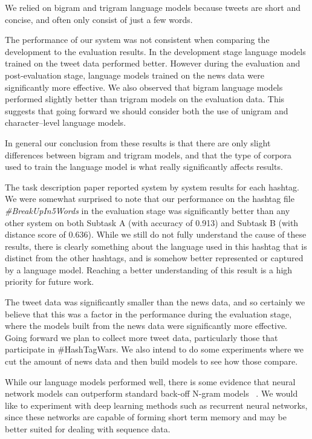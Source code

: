 \documentclass[11pt,a4paper]{article}
\begin{document}
We relied on bigram and trigram language models because 
tweets are short and concise, and often only consist of just
a few words. 

The performance of our system was not consistent when
comparing the development to the evaluation results.
In the development stage language models trained on the
tweet data performed better.
However during the evaluation and post-evaluation stage, 
language models trained on the news data were 
significantly more effective. We also observed that
bigram language models performed slightly better than
trigram models on the evaluation data. This suggests
that going forward we should consider both the use of
unigram and character--level language models. 

In general our 
conclusion from these results is that there are only 
slight differences between bigram and trigram models,
and that the type of corpora used to train the language
model is what really significantly affects results. 

The task description paper \cite{PotashRR17} 
reported system by system results for each hashtag. 
We were somewhat surprised to note that our 
performance on the hashtag file 
\textit{\#BreakUpIn5Words} in the evaluation 
stage was significantly 
better than any other  system on both Subtask A 
(with accuracy of 0.913) and Subtask B 
(with distance score of 0.636). While we still do not 
fully understand the cause of these results, there is clearly
something about the language used in this hashtag that
is distinct from the other hashtags, and is somehow better
represented or captured by a language model. Reaching a better
understanding of this  result is a high priority for future work. 

The tweet data was significantly smaller than the news data, and
so certainly we believe that this was a factor in the performance
during the evaluation stage, where the models built from the news
data were significantly more effective. Going forward we plan to
collect more tweet data, particularly those that participate in 
\#HashTagWars. We also intend to do some experiments where we 
cut the amount of news data and then build models to see how 
those compare. 

While our language models performed well, there
is some evidence that neural network models
can outperform 
standard back-off N-gram models ~\cite{mikolov2011extensions}. 
We would like to experiment with deep learning methods such 
as recurrent neural networks, since 
these networks are capable of 
forming short term memory and may be better suited for dealing 
with sequence data. 
\end{document}
